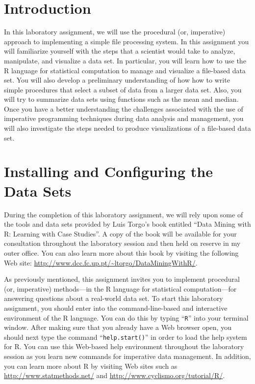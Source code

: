


\usepackage[compact]{titlesec}



\section*{Introduction}

In this laboratory assignment, we will use the procedural (or, imperative) approach to implementing a simple file
processing system.  In this assignment you will familiarize yourself with the steps that a scientist would take to
analyze, manipulate, and visualize a data set. In particular, you will learn how to use the R language for statistical
computation to manage and visualize a file-based data set. You will also develop a preliminary understanding of how how
to write simple procedures that select a subset of data from a larger data set. Also, you will try to summarize data
sets using functions such as the mean and median. Once you have a better understanding the challenges associated with
the use of imperative programming techniques during data analysis and management, you will also investigate the steps
needed to produce visualizations of a file-based data set.

\section*{Installing and Configuring the Data Sets}

During the completion of this laboratory assignment, we will rely upon some of the tools and data sets provided by Luis
Torgo's book entitled ``Data Mining with R: Learning with Case Studies''. A copy of the book will be available for your
consultation throughout the laboratory session and then held on reserve in my outer office. You can also learn more
about this book by visiting the following Web site: \url{http://www.dcc.fc.up.pt/~ltorgo/DataMiningWithR/}.

As previously mentioned, this assignment invites you to implement procedural (or, imperative) methods---in the R
language for statistical computation---for answering questions about a real-world data set.  To start this laboratory
assignment, you should enter into the command-line-based and interactive environment of the R language. You can do this
by typing ``{\tt R}'' into your terminal window. After making sure that you already have a Web browser open, you should
next type the command ``{\tt help.start()}'' in order to load the help system for R. You can use this Web-based help
environment throughout the laboratory session as you learn new commands for imperative data management. In addition, you
can learn more about R by visiting Web sites such as \url{http://www.statmethods.net/} and
\url{http://www.cyclismo.org/tutorial/R/}.

